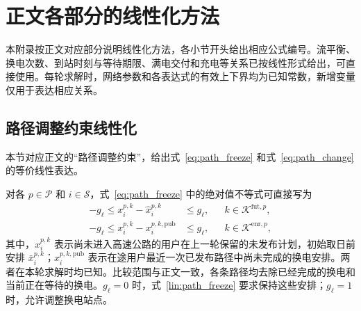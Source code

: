 \section{正文各部分的线性化方法}
\label{lin:appendix}

本附录按正文对应部分说明线性化方法，各小节开头给出相应公式编号。流平衡、换电次数、到站时刻与等待期限、满电交付和充电等关系已按线性形式给出，可直接使用。每轮求解时，网络参数和各表达式的有效上下界均为已知常数，新增变量仅用于表达相应关系。

\subsection{路径调整约束线性化}
\label{lin:path_adjustment_section}
本节对应正文的“路径调整约束”，给出式~\eqref{eq:path_freeze} 和式~\eqref{eq:path_change} 的等价线性表达。

对各 $p\in\mathcal P$ 和 $i\in\mathcal S$，式~\eqref{eq:path_freeze} 中的绝对值不等式可直接写为
\begin{equation}
\begin{aligned}
-g_\ell\le x_i^{p,k}-\widehat{x}_i^{p,k}&\le g_\ell,
&&k\in\mathcal K^{\mathrm{fut},p},\\
-g_\ell\le x_i^{p,k}-x_i^{p,k,\mathrm{pub}}&\le g_\ell,
&&k\in\mathcal K^{\mathrm{enr},p},
\end{aligned}
\label{lin:path_freeze}
\end{equation}
其中，$\widehat{x}_i^{p,k}$ 表示尚未进入高速公路的用户在上一轮保留的未发布计划，初始取日前安排 $\bar x_i^{p,k}$；$x_i^{p,k,\mathrm{pub}}$ 表示在途用户最近一次已发布路径中尚未完成的换电安排。两者在本轮求解时均已知。比较范围与正文一致，各条路径均去除已经完成的换电和当前正在等待的换电。$g_\ell=0$ 时，式~\eqref{lin:path_freeze} 要求保持这些安排；$g_\ell=1$ 时，允许调整换电站点。

